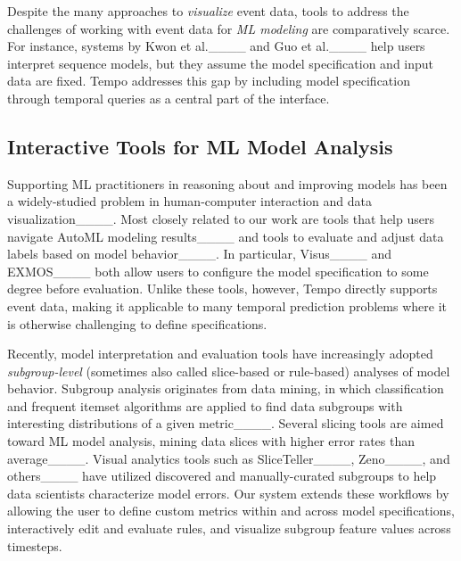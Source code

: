 Despite the many approaches to \textit{visualize} event data, tools to address the challenges of working with event data for \textit{ML modeling} are comparatively scarce. 
For instance, systems by Kwon et al.____ and Guo et al.____ help users interpret sequence models, but they assume the model specification and input data are fixed. 
Tempo addresses this gap by including model specification through temporal queries as a central part of the interface.

\subsection{Interactive Tools for ML Model Analysis}
\label{sec:related-subgroups}

Supporting ML practitioners in reasoning about and improving models has been a widely-studied problem in human-computer interaction and data visualization____. 
Most closely related to our work are tools that help users navigate AutoML modeling results____ and tools to evaluate and adjust data labels based on model behavior____. 
In particular, Visus____ and EXMOS____ both allow users to configure the model specification to some degree before evaluation. 
Unlike these tools, however, Tempo directly supports event data, making it applicable to many temporal prediction problems where it is otherwise challenging to define specifications.%

Recently, model interpretation and evaluation tools have increasingly adopted \textit{subgroup-level} (sometimes also called slice-based or rule-based) analyses of model behavior. 
Subgroup analysis originates from data mining, in which classification and frequent itemset algorithms are applied to find data subgroups with interesting distributions of a given metric____.
Several slicing tools are aimed toward ML model analysis, mining data slices with higher error rates than average____.
Visual analytics tools such as SliceTeller____, Zeno____, and others____ have utilized discovered and manually-curated subgroups to help data scientists characterize model errors.
Our system extends these workflows by allowing the user to define custom metrics within and across model specifications, interactively edit and evaluate rules, and visualize subgroup feature values across timesteps.

